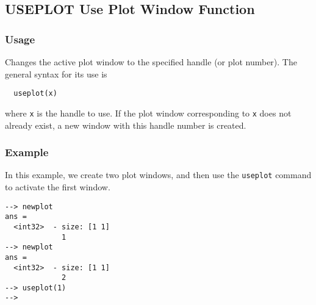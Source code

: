 %
%
%
\subsection{USEPLOT Use Plot Window Function}
\subsubsection{Usage}
Changes the active plot window to the specified handle (or plot number).  
The general syntax for its use is 
\begin{verbatim}
  useplot(x)
\end{verbatim}
where \verb|x| is the handle to use.  If the plot window corresponding to
\verb|x| does not already exist, a new window with this handle number is 
created.
\subsubsection{Example}
In this example, we create two plot windows, and then use the \verb|useplot|
command to activate the first window.
\begin{verbatim}
--> newplot
ans =
  <int32>  - size: [1 1]
             1
--> newplot
ans =
  <int32>  - size: [1 1]
             2
--> useplot(1)
-->
\end{verbatim}
